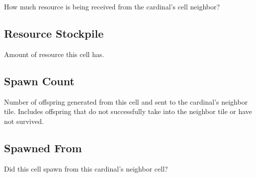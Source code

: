 
How much resource is being received from the cardinal's cell neighbor?

\subsection{Resource Stockpile}


Amount of resource this cell has.

\subsection{Spawn Count}


Number of offspring generated from this cell and sent to the cardinal's neighbor tile.
Includes offspring that do not successfully take into the neighbor tile or have not survived.

\subsection{Spawned From}


Did this cell spawn from this cardinal's neighbor cell?
